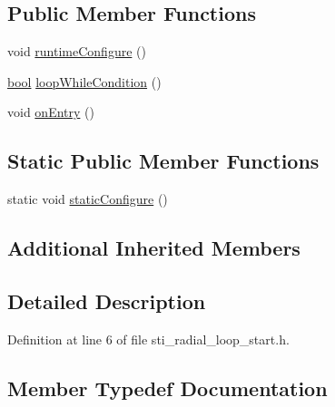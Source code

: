 \subsection*{Public Member Functions}
\begin{DoxyCompactItemize}
\item 
void \hyperlink{structsm__dance__bot_1_1radial__motion__states_1_1StiRadialLoopStart_a5d61523a7767c515712bd2ec23e27571}{runtime\+Configure} ()
\item 
\hyperlink{classbool}{bool} \hyperlink{structsm__dance__bot_1_1radial__motion__states_1_1StiRadialLoopStart_a05d31b8062dae8eccc4d66ab21a0b720}{loop\+While\+Condition} ()
\item 
void \hyperlink{structsm__dance__bot_1_1radial__motion__states_1_1StiRadialLoopStart_a83662aeb4d86fe809ea02bc186e32415}{on\+Entry} ()
\end{DoxyCompactItemize}
\subsection*{Static Public Member Functions}
\begin{DoxyCompactItemize}
\item 
static void \hyperlink{structsm__dance__bot_1_1radial__motion__states_1_1StiRadialLoopStart_a5ff99328ae5482be3b666166f9ca769b}{static\+Configure} ()
\end{DoxyCompactItemize}
\subsection*{Additional Inherited Members}


\subsection{Detailed Description}


Definition at line 6 of file sti\+\_\+radial\+\_\+loop\+\_\+start.\+h.



\subsection{Member Typedef Documentation}
\mbox{\label{structsm__dance__bot_1_1radial__motion__states_1_1StiRadialLoopStart_a817d8c91080ccf4ff0f387455d26f94c}} 
